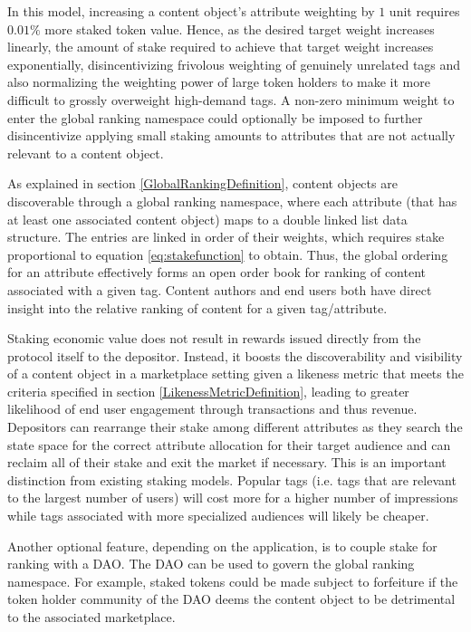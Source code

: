 In this model, increasing a content object's attribute weighting by $1$ unit requires $0.01\%$ more staked token value. Hence, as the desired target weight increases linearly, the amount of stake required to achieve that target weight increases exponentially, disincentivizing frivolous weighting of genuinely unrelated tags and also normalizing the weighting power of large token holders to make it more difficult to grossly overweight high-demand tags. 
A non-zero minimum weight to enter the global ranking namespace could optionally be imposed to further disincentivize applying small staking amounts to attributes that are not actually relevant to a content object.

As explained in section \ref{GlobalRankingDefinition}, content objects are discoverable through a global ranking namespace, where each attribute (that has at least one associated content object) maps to a double linked list data structure. The entries are linked in order of their weights, which requires stake proportional to equation \ref{eq:stakefunction} to obtain. Thus, the global ordering for an attribute effectively forms an open order book for ranking of content associated with a given tag. Content authors and end users both have direct insight into the relative ranking of content for a given tag/attribute. 

Staking economic value does not result in rewards issued directly from the protocol itself to the depositor. Instead, it boosts the discoverability and visibility of a content object in a marketplace setting given a likeness metric that meets the criteria specified in section \ref{LikenessMetricDefinition}, leading to greater likelihood of end user engagement through transactions and thus revenue. Depositors can rearrange their stake among different attributes as they search the state space for the correct attribute allocation for their target audience and can reclaim all of their stake and exit the market if necessary. This is an important distinction from existing staking models. Popular tags (i.e. tags that are relevant to the largest number of users) will cost more for a higher number of impressions while tags associated with more specialized audiences will likely be cheaper.

Another optional feature, depending on the application, is to couple stake for ranking with a DAO. The DAO can be used to govern the global ranking namespace. For example, staked tokens could be made subject to forfeiture if the token holder community of the DAO deems the content object to be detrimental to the associated marketplace. 

